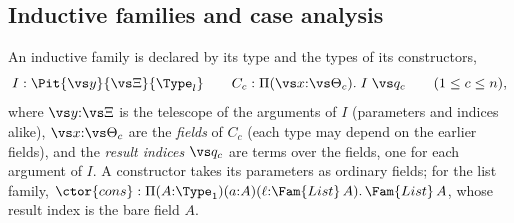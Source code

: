 \subsection{Inductive families and case analysis}\label{sec:ind}

An inductive family is declared by its type and the types of its constructors,
\[
I : \Pit{\vs y}{\vs\Xi}{\Type_l}
\qquad
C_c : \Pi(\vs x{:}\vs\Theta_c).\; I\;\vs q_c
\qquad (1\le c\le n),
\]
where $\vs y{:}\vs\Xi$ is the telescope of the arguments of $I$ (parameters and indices alike), $\vs x{:}\vs\Theta_c$ are the \emph{fields} of $C_c$ (each type may depend on the earlier fields), and the \emph{result indices} $\vs q_c$ are terms over the fields, one for each argument of $I$.
A constructor takes its parameters as ordinary fields; for the list family, $\ctor{cons} : \Pi(A{:}\Type_1)(a{:}A)(\ell{:}\Fam{List}\,A).\,\Fam{List}\,A$, whose result index is the bare field $A$.

